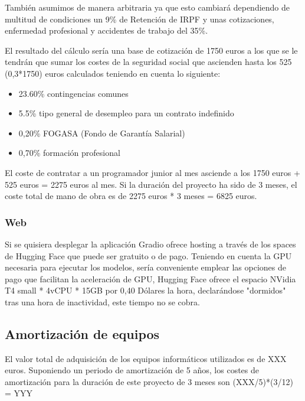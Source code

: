 También asumimos de manera arbitraria ya que esto cambiará dependiendo de multitud de condiciones un 9\% de Retención de IRPF y unas cotizaciones, enfermedad profesional y accidentes de trabajo del 35\%.

El resultado del cálculo sería una base de cotización de 1750 euros a los que se le tendrán que sumar los costes de la seguridad social que ascienden hasta los 525 (0,3*1750) euros calculados teniendo en cuenta lo siguiente:

\begin{itemize}

    \item 23.60\% contingencias comunes
    \item 5.5\% tipo general de desempleo para un contrato indefinido
    \item 0,20\% FOGASA (Fondo de Garantía Salarial)
    \item 0,70\% formación profesional

\end{itemize}

El coste de contratar a un programador junior al mes asciende a los 1750 euros + 525 euros = 2275 euros al mes. Si la duración del proyecto ha sido de 3 meses, el coste total de mano de obra es de 2275 euros * 3 meses = 6825 euros. \cite{Billin_2014}

\subsubsection{Web}

Si se quisiera desplegar la aplicación Gradio ofrece hosting a través de los spaces de Hugging Face que puede ser gratuito o de pago. Teniendo en cuenta la GPU necesaria para ejecutar los modelos, sería conveniente emplear las opciones de pago que facilitan la aceleración de GPU, Hugging Face ofrece el espacio NVidia T4 small * 4vCPU * 15GB por 0,40 Dólares la hora, declarándose "dormidos" tras una hora de inactividad, este tiempo no se cobra.

\cite{Hugging_Face_2016}

\subsection{Amortización de equipos}

El valor total de adquisición de los equipos informáticos utilizados es de XXX euros. Suponiendo un periodo de amortización de 5 años, los costes de amortización para la duración de este proyecto de 3 meses son (XXX/5)*(3/12) = YYY

